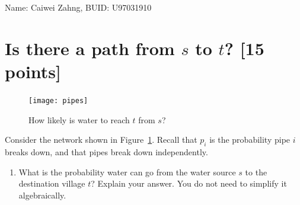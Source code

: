 \usepackage{url,hyperref}



Name: Caiwei Zahng, BUID: U97031910

\section{Is there a path from $s$ to $t$? [15 points]}  
 \begin{figure}[!ht]
	\centering
	\texttt{[image: pipes]}
	\caption{\label{fig:pipes} How likely is water to reach $t$ from $s$?}
\end{figure}

Consider the network shown in Figure~\ref{fig:pipes}. Recall that $p_i$ is the probability pipe $i$ breaks down, and that pipes break down independently. 



\begin{tcolorbox}
	\begin{enumerate}
		\item What is the probability water can go from the water source $s$ to the destination village $t$? Explain your answer. You do not need to simplify it algebraically.
	\end{enumerate}
\end{tcolorbox}

